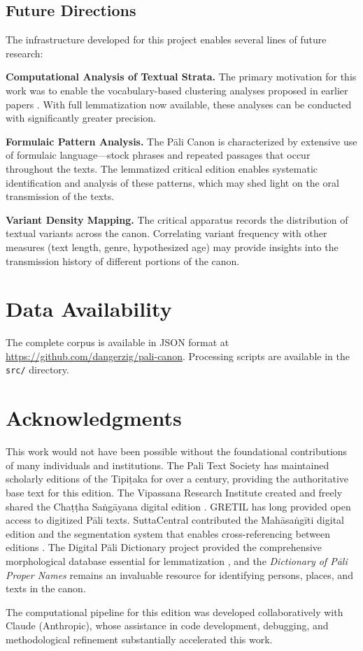 \documentclass[unnumsec,webpdf,contemporary,large]{oup-authoring-template}
\begin{document}
\subsection{Future Directions}

The infrastructure developed for this project enables several lines of future research:

\textbf{Computational Analysis of Textual Strata.} The primary motivation for this work was to enable the vocabulary-based clustering analyses proposed in earlier papers \citep{zigmond2021,zigmond2023}. With full lemmatization now available, these analyses can be conducted with significantly greater precision.

\textbf{Formulaic Pattern Analysis.} The Pāli Canon is characterized by extensive use of formulaic language—stock phrases and repeated passages that occur throughout the texts. The lemmatized critical edition enables systematic identification and analysis of these patterns, which may shed light on the oral transmission of the texts.

\textbf{Variant Density Mapping.} The critical apparatus records the distribution of textual variants across the canon. Correlating variant frequency with other measures (text length, genre, hypothesized age) may provide insights into the transmission history of different portions of the canon.

\section{Data Availability}

The complete corpus is available in JSON format at \url{https://github.com/dangerzig/pali-canon}. Processing scripts are available in the \texttt{src/} directory.

\section*{Acknowledgments}

This work would not have been possible without the foundational contributions of many individuals and institutions. The Pali Text Society has maintained scholarly editions of the Tipiṭaka for over a century, providing the authoritative base text for this edition. The Vipassana Research Institute created and freely shared the Chaṭṭha Saṅgāyana digital edition \citep{vri}. GRETIL \citep{gretil} has long provided open access to digitized Pāli texts. SuttaCentral contributed the Mahāsaṅgīti digital edition and the segmentation system that enables cross-referencing between editions \citep{suttacentral}. The Digital Pāli Dictionary project provided the comprehensive morphological database essential for lemmatization \citep{dpd2026}, and the \emph{Dictionary of Pāli Proper Names} \citep{malalasekera1937} remains an invaluable resource for identifying persons, places, and texts in the canon.

The computational pipeline for this edition was developed collaboratively with Claude (Anthropic), whose assistance in code development, debugging, and methodological refinement substantially accelerated this work.



\end{document}
